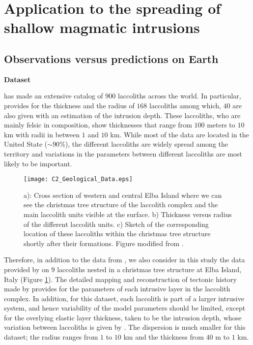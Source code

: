 \section{Application to the spreading of shallow magmatic intrusions}
\label{C2-sec:appl-earth-moon}

\subsection{Observations versus predictions on Earth}
\label{C2-sec:observ-vs-pred}

\vspace{.5cm} \textbf{Dataset} \vspace{.5cm}

\citet{E:2015tl}  has made  an extensive  catalog of  $900$ laccoliths
across the  world.  In  particular, \citet{E:2015tl} provides  for the
thickness and  the radius  of $168$ laccoliths  among which,  $40$ are
also  given  with  an  estimation   of  the  intrusion  depth.   These
laccoliths,  who are  mainly felsic  in composition,  show thicknesses
that range from $100$ meters to $10$  km with radii in between $1$ and
$10$  km.  While  most of  the data  are located  in the  United State
($\sim 90\%$),  the different laccoliths  are widely spread  among the
territory  and   variations  in   the  parameters   between  different
laccoliths are most likely to be important.
\begin{figure}[h!]
  \begin{center}
    \graphicspath{ {/Users/thorey/Documents/These/Manuscript/Figure/Chapter2/} }
    \texttt{[image: C2\_Geological\_Data.eps]}
    \caption{a):  Cross section  of  western and  central Elba  Island
      where we can  see the christmas tree structure  of the laccolith
      complex and the main laccolith  units visible at the surface. b)
      Thickness  versus radius  of the  different laccolith  units. c)
      Sketch of the corresponding  location of these laccoliths within
      the    christmas   tree    structure    shortly   after    their
      formations. Figure modified from \citet{Rocchi:2002jy}.}
    \label{C2_Geological_Data}
  \end{center}
\end{figure}

Therefore,  in addition  to the  data from  \citet{E:2015tl}, we  also
consider in this  study the data provided  by \citet{Rocchi:2002jy} on
$9$ laccoliths  nested in a  christmas tree structure at  Elba Island,
Italy  (Figure \ref{C2_Geological_Data}).   The  detailed mapping  and
reconstruction  of  tectonic  history  made  by  \citet{Rocchi:2002jy}
provides for the  parameters of each intrusive layer  in the laccolith
complex. In  addition, for this dataset,  each laccolith is part  of a
larger intrusive system, and hence variability of the model parameters
should be limited,  except for the overlying  elastic layer thickness,
taken to be the intrusion depth, whose variation between laccoliths is
given by  \citet{Rocchi:2002jy}.  The  dispersion is much  smaller for
this dataset; the radius ranges from  $1$ to $10$ km and the thickness
from $40$ m to $1$ km.

